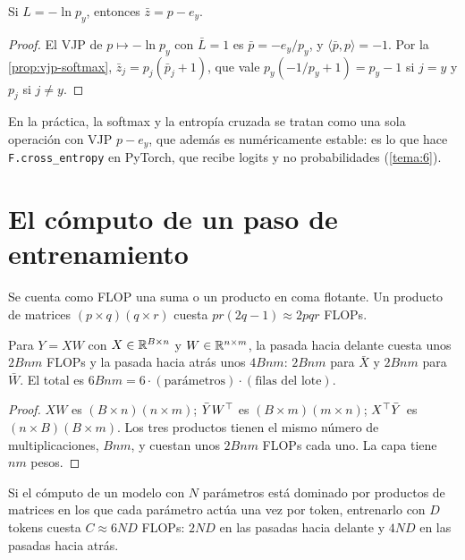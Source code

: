 \begin{corolario}\label{cor:ce}
Si $L=-\ln p_y$, entonces $\bar z=p-e_y$.
\end{corolario}

\begin{proof}
El VJP de $p\mapsto-\ln p_y$ con $\bar L=1$ es $\bar p=-e_y/p_y$, y $\langle\bar p,p\rangle=-1$. Por la \cref{prop:vjp-softmax}, $\bar z_j=p_j(\bar p_j+1)$, que vale $p_y(-1/p_y+1)=p_y-1$ si $j=y$ y $p_j$ si $j\ne y$.
\end{proof}

En la práctica, la softmax y la entropía cruzada se tratan como una sola operación con VJP $p-e_y$, que además es numéricamente estable: es lo que hace \texttt{F.cross\_entropy} en PyTorch, que recibe logits y no probabilidades (\cref{tema:6}).

\section{El cómputo de un paso de entrenamiento}

Se cuenta como FLOP una suma o un producto en coma flotante. Un producto de matrices $(p\times q)(q\times r)$ cuesta $pr(2q-1)\approx 2pqr$ FLOPs.

\begin{proposicion}\label{prop:flops}
Para $Y=XW$ con $X\in\mathbb{R}^{B\times n}$ y $W\in\mathbb{R}^{n\times m}$, la pasada hacia delante cuesta unos $2Bnm$ FLOPs y la pasada hacia atrás unos $4Bnm$: $2Bnm$ para $\bar X$ y $2Bnm$ para $\bar W$. El total es $6Bnm=6\cdot(\text{parámetros})\cdot(\text{filas del lote})$.
\end{proposicion}

\begin{proof}
$XW$ es $(B\times n)(n\times m)$; $\bar YW^{\top}$ es $(B\times m)(m\times n)$; $X^{\top}\bar Y$ es $(n\times B)(B\times m)$. Los tres productos tienen el mismo número de multiplicaciones, $Bnm$, y cuestan unos $2Bnm$ FLOPs cada uno. La capa tiene $nm$ pesos.
\end{proof}

\begin{corolario}[Regla $6ND$]\label{cor:6nd}
Si el cómputo de un modelo con $N$ parámetros está dominado por productos de matrices en los que cada parámetro actúa una vez por token, entrenarlo con $D$ tokens cuesta $C\approx 6ND$ FLOPs: $2ND$ en las pasadas hacia delante y $4ND$ en las pasadas hacia atrás.
\end{corolario}

